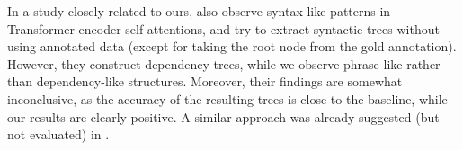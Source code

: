 \documentclass[11pt,a4paper]{article}
\def\RR#1{{\color{blue}RR: \it #1}}
\def\DM#1{{\color{red}DM: \it #1}}
\def\RR#1{}
\def\DM#1{}
\begin{document}

\RR{Tady je zakomentovaný relwork z Hewitta}


In a study closely related to ours,
\citet{raganato:2018} also observe syntax-like patterns in Transformer encoder self-attentions, and try to extract syntactic trees without using annotated data (except for taking the root node from the gold annotation).
However, they construct dependency trees, while we observe phrase-like rather than dependency-like structures.
Moreover, their findings are somewhat inconclusive,
as the accuracy of the resulting trees is close to the
baseline,
while our results are clearly positive.
A similar approach was already suggested (but not evaluated) in \citep{marecek:blackbox2018}.


\end{document}
